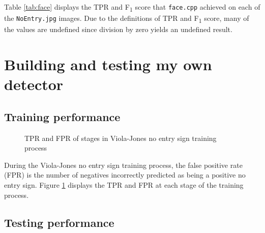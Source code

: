 \documentclass[twocolumn, 10pt, a4paper]{article}
\begin{document}
Table \ref{tab:face} displays the TPR and F\textsubscript{1} score that \texttt{face.cpp} achieved on each of the \texttt{NoEntry\textasteriskcentered.jpg} images.
Due to the definitions of TPR and F\textsubscript{1} score, many of the values are undefined since division by zero yields an undefined result.

\clearpage

\section{Building and testing my own detector}

\subsection{Training performance}

\begin{figure}[h]
  \dataset
  \caption{TPR and FPR of stages in Viola-Jones no entry sign training process}\label{vj_training}
\end{figure}

During the Viola-Jones no entry sign training process, the false positive rate (FPR) is the number of negatives incorrectly predicted as being a positive no entry sign.
Figure \ref{vj_training} displays the TPR and FPR at each stage of the training process.

\subsection{Testing performance}
\end{document}
